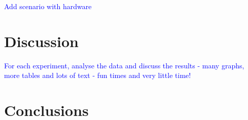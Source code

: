 \textcolor{blue}{Add scenario with hardware}

\section{Discussion}\label{sec:evaluation_discussion}

\textcolor{blue}{For each experiment, analyse the data and discuss the results - many graphs, more tables and lots of text - fun times and very little time!}

\section{Conclusions}\label{sec:evaluation_conclusions}

